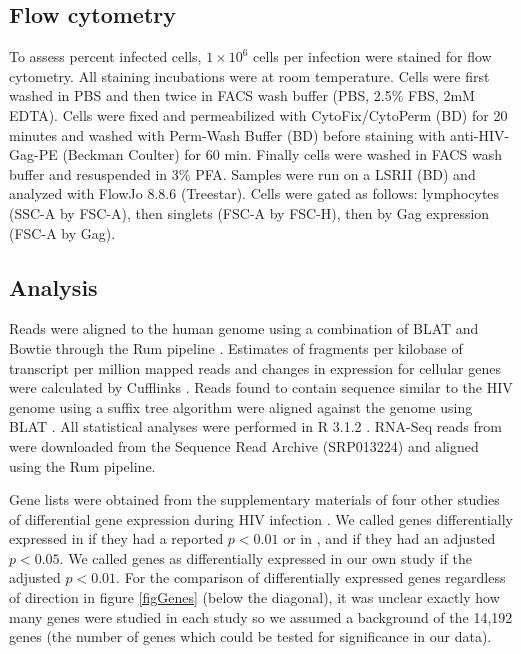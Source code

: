 \documentclass[../sherrill-Mix_thesis.tex]{subfiles}
\begin{document}
	\subsection{Flow cytometry}
		To assess percent infected cells, $1 \times 10^6$ cells per infection were stained for flow cytometry.  All staining incubations were at room temperature.  Cells were first washed in PBS and then twice in FACS wash buffer (PBS, 2.5\% FBS, 2mM EDTA).  Cells were fixed and permeabilized with CytoFix/CytoPerm (BD) for 20 minutes and washed with Perm-Wash Buffer (BD) before staining with anti-HIV-Gag-PE (Beckman Coulter) for 60 min.  Finally cells were washed in FACS wash buffer and resuspended in 3\% PFA.  Samples were run on a LSRII (BD) and analyzed with FlowJo 8.8.6 (Treestar). Cells were gated as follows: lymphocytes (SSC-A by FSC-A), then singlets (FSC-A by FSC-H), then by Gag expression (FSC-A by Gag). 

	\subsection{Analysis}
		Reads were aligned to the human genome using a combination of BLAT \citep{Kent2002} and Bowtie \citep{Langmead2009} through the Rum pipeline \citep{Grant2011}.  Estimates of fragments per kilobase of transcript per million mapped reads and changes in expression for cellular genes were calculated by Cufflinks \citep{Trapnell2010}. Reads found to contain sequence similar to the HIV genome using a suffix tree algorithm were aligned against the \hivEight{} genome using BLAT \citep{Kent2002}. All statistical analyses were performed in R 3.1.2 \cite{RCoreTeam2012}. RNA-Seq reads from \citet{Chang2011} were downloaded from the Sequence Read Archive (SRP013224) and aligned using the Rum pipeline.

		Gene lists were obtained from the supplementary materials of four other studies of differential gene expression during HIV infection \citep{Li2009,Imbeault2012,Lefebvre2011,Chang2011}. We called genes differentially expressed in \citet{Li2009} if they had a reported $p<0.01$ or in \citet{Lefebvre2011}, \citet{Chang2011} and \citet{Imbeault2012} if they had an adjusted $p<0.05$. We called genes as differentially expressed in our own study if the adjusted $p<0.01$. For the comparison of differentially expressed genes regardless of direction in figure \ref{figGenes} (below the diagonal), it was unclear exactly how many genes were studied in each study so we assumed a background of the 14,192 genes (the number of genes which could be tested for significance in our data). 
		
\end{document}
